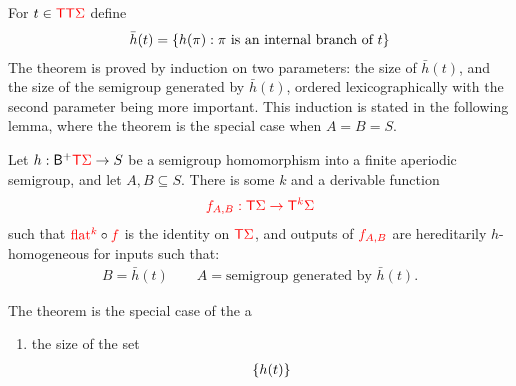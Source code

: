 \newcommand{\hint}{\bar h}
\newcommand{\hintplus}{\bar h^+}
\newcommand{\branchesplus}{\mathsf B^+}
For $t \in {\color{red}{\mathsf T}}  {\color{red}{\mathsf T}} {\color{red}{\Sigma}}$ define 
\begin{align*}
    \hint(t) = \set{h(\pi) : \text{$\pi$ is an internal branch of $t$}}
\end{align*}
The theorem is proved by induction on two parameters: the size of $\hint(t)$, and the size of the semigroup generated by $\hint(t)$, ordered lexicographically with the second parameter being more important. This induction is stated in the following lemma, where the theorem is the special case when $A=B=S$. 
\begin{lemma} Let $h : \branchesplus \tmonad \rSigma \to S$ be a semigroup homomorphism into a finite aperiodic semigroup, and let  $A,B \subseteq S$. There is some $k$ and  a derivable function
    \begin{align*}
        {\color{red}{f_{A,B}: {\color{red}{\mathsf T}}{\color{red}{\Sigma}}\to {\color{red}{\mathsf T}}^k {\color{red}{\Sigma}}}}  
    \end{align*}
    such that ${\color{red}{\mathrm{flat}}}^{{\color{red}{k}}} \circ {\color{red}{f}}$ is the identity on ${\color{red}{\mathsf T}} {\color{red}{\Sigma}}$, and   outputs of  ${\color{red}{f_{A,B}}}$ are hereditarily $h$-homogeneous for inputs such that:
    \begin{align*}
    B = \hint(t) \qquad A = \text{semigroup generated by $\hint(t)$.}
    \end{align*}
        
\end{lemma}
The theorem is the special case of the a
\begin{enumerate}
    \item the size of the set 
    \begin{align*}
    \{h(t)\}
    \end{align*}
\end{enumerate}

